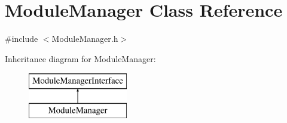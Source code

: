 \hypertarget{class_module_manager}{}\section{Module\+Manager Class Reference}
\label{class_module_manager}


{\ttfamily \#include $<$Module\+Manager.\+h$>$}

Inheritance diagram for Module\+Manager\+:\begin{figure}[H]
\begin{center}
\leavevmode
\includegraphics[height=2.000000cm]{class_module_manager}
\end{center}
\end{figure}
